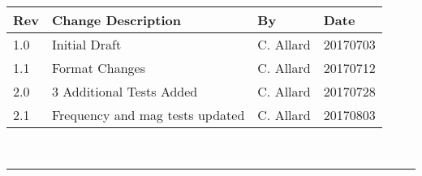 \documentclass[]{BasiliskReportMemo}
\begin{document}
\makeCover

%
%
\pagestyle{empty}
{\renewcommand{\arraystretch}{2}
\noindent
\begin{longtable}{|p{0.5in}|p{3.5in}|p{1.07in}|p{0.9in}|}
\hline
{\bfseries Rev} & {\bfseries Change Description} & {\bfseries By}& {\bfseries Date} \\
\hline
1.0 & Initial Draft & C. Allard & 20170703\\
\hline
1.1 & Format Changes & C. Allard & 20170712\\
\hline
2.0 & 3 Additional Tests Added & C. Allard & 20170728\\
\hline
2.1 & Frequency and mag tests updated & C. Allard & 20170803\\
\hline
\end{longtable}
}



\newpage
\setcounter{page}{1}
\pagestyle{fancy}

\tableofcontents %
~\\ \hrule ~\\ %










	










\end{document}
